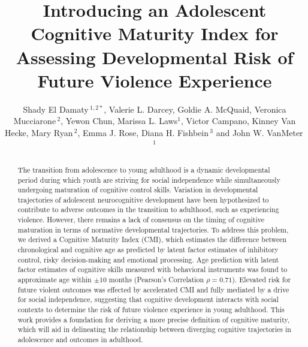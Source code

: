 \documentclass[utf8]{frontiersSCNS} %
\def\firstAuthorLast{El Damaty {et~al.}} %
\def\Authors{Shady El Damaty\,$^{1,2*}$, Valerie L. Darcey, Goldie A. McQuaid, Veronica Mucciarone\,$^{2}$, Yewon Chun, Marissa L. Laws$^{1}$, Victor Campano, Kinney Van Hecke, Mary Ryan\,$^{2}$, Emma J. Rose, Diana H. Fishbein\,$^{3}$ and John W. VanMeter\,$^{1}$}
\begin{document}
\onecolumn
{}
\title{Introducing an Adolescent Cognitive Maturity Index for Assessing Developmental Risk of Future Violence Experience} 
\author[\firstAuthorLast ]{\Authors} %
\address{} %
\correspondance{} %
\extraAuth{}
\maketitle \begin{abstract}

The transition from adolescence to young adulthood is a dynamic developmental period during which youth are striving for social independence while simultaneously undergoing maturation of cognitive control skills. Variation in developmental trajectories of adolescent neurocognitive development have been hypothesized to contribute to adverse outcomes in the transition to adulthood, such as experiencing violence. However, there remains a lack of consensus on the timing of cognitive maturation in terms of normative developmental trajectories. To address this problem, we derived a Cognitive Maturity Index (CMI), which estimates the difference between chronological and cognitive age as predicted by latent factor estimates of inhibitory control, risky decision-making and emotional processing. Age prediction with latent factor estimates of cognitive skills measured with behavioral instruments was found to approximate age within $\pm 10$ months (Pearson's Correlation $\rho=0.71$). Elevated risk for future violent outcomes was effected by accelerated CMI and fully mediated by a drive for social independence, suggesting that cognitive development interacts with social contexts to determine the risk of future violence experience in young adulthood. This work provides a foundation for deriving a more precise definition of cognitive maturity, which will aid in delineating the relationship between diverging cognitive trajectories in adolescence and outcomes in adulthood.

\section{}


\end{abstract}
\end{document}
